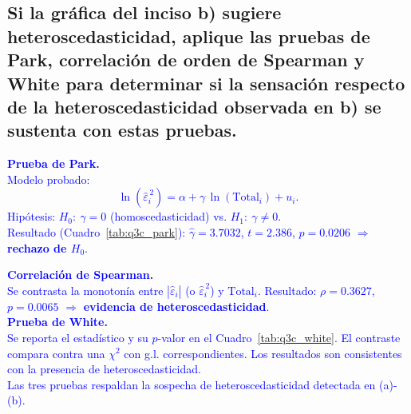 \documentclass[10pt]{article}
\begin{document}
\subsection{Si la gráfica del inciso b) sugiere heteroscedasticidad, aplique las pruebas de Park, correlación de orden de Spearman y White para determinar si la sensación respecto de la heteroscedasticidad observada en b) se sustenta con estas pruebas.}
    \textcolor{blue}{
        \textbf{Prueba de Park.} \\
        Modelo probado:
        \begin{equation*}
        \ln(\widehat{\varepsilon}_i^{\,2}) = \alpha + \gamma\,\ln(\text{Total}_i) + u_i.
        \end{equation*}
        Hipótesis: $H_0\!:\ \gamma=0$ (homoscedasticidad) vs. $H_1\!:\ \gamma\neq 0$. \\
        Resultado (Cuadro~\ref{tab:q3c_park}): \(\hat\gamma=3.7032\), $t=2.386$, $p=0.0206$ $\Rightarrow$ \textbf{rechazo de $H_0$}.
        
        \vspace{0.2cm}
        \textbf{Correlación de Spearman.} \\
        Se contrasta la monotonía entre $|\widehat{\varepsilon}_i|$ (o $\widehat{\varepsilon}_i^{\,2}$) y $\text{Total}_i$. Resultado: $\rho=0.3627$, $p=0.0065$ $\Rightarrow$ \textbf{evidencia de heteroscedasticidad}.\\
        
        \vspace{0.2cm}
        \textbf{Prueba de White.} \\
        Se reporta el estadístico y su $p$-valor en el Cuadro~\ref{tab:q3c_white}. El contraste compara contra una $\chi^2$ con g.l. correspondientes. Los resultados son consistentes con la presencia de heteroscedasticidad.
        \\
        
        Las tres pruebas respaldan la sospecha de heteroscedasticidad detectada en (a)-(b).
    }
\end{document}
